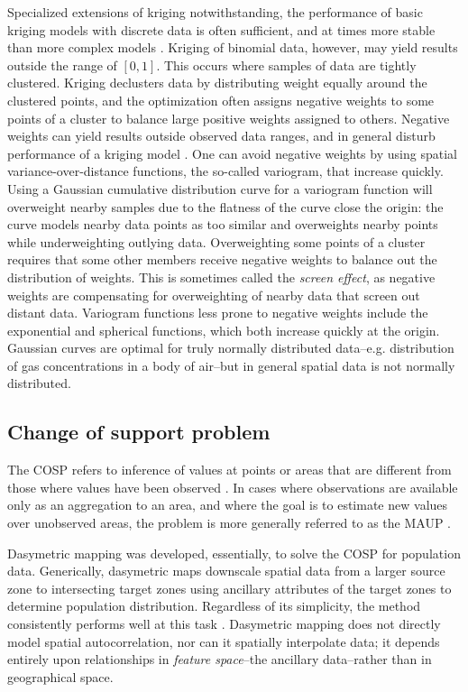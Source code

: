 Specialized extensions of kriging notwithstanding, the performance of basic kriging models with discrete data is often sufficient, and at times more stable than more complex models \citep{oliver98}.  Kriging of binomial data, however, may yield results outside the range of $[0, 1]$.  This occurs where samples of data are tightly clustered.  Kriging declusters data by distributing weight equally around the clustered points, and the optimization often assigns negative weights to some points of a cluster to balance large positive weights assigned to others.  Negative weights can yield results outside observed data ranges, and in general disturb performance of a kriging model \citep{duetsch96}.  One can avoid negative weights by using spatial variance-over-distance functions, the so-called variogram, that increase quickly.  Using a Gaussian cumulative distribution curve for a variogram function will overweight nearby samples due to the flatness of the curve close the origin: the curve models nearby data points as too similar and overweights nearby points while underweighting outlying data.  Overweighting some points of a cluster requires that some other members receive negative weights to balance out the distribution of weights.  This is sometimes called the {\em screen effect}, as negative weights are compensating for overweighting of nearby data that screen out distant data.  Variogram functions less prone to negative weights include the exponential and spherical functions, which both increase quickly at the origin.  Gaussian curves are optimal for truly normally distributed data--e.g. distribution of gas concentrations in a body of air--but in general spatial data is not normally distributed.


\subsection{Change of support problem}

The COSP refers to inference of values at points or areas that are different from those where values have been observed \citep{gelfand01}.  In cases where observations are available only as an aggregation to an area, and where the goal is to estimate new values over unobserved areas, the problem is more generally referred to as the MAUP \citep{cressie96}.  %

Dasymetric mapping was developed, essentially, to solve the COSP for population data.  Generically, dasymetric maps downscale spatial data from a larger source zone to intersecting target zones using ancillary attributes of the target zones to determine population distribution.  Regardless of its simplicity, the method consistently performs well at this task \citep{eicher01, holt11, barrozo16, amos17}.  Dasymetric mapping does not directly model spatial autocorrelation, nor can it spatially interpolate data; it depends entirely upon relationships in {\em feature space}--the ancillary data--rather than in geographical space.

